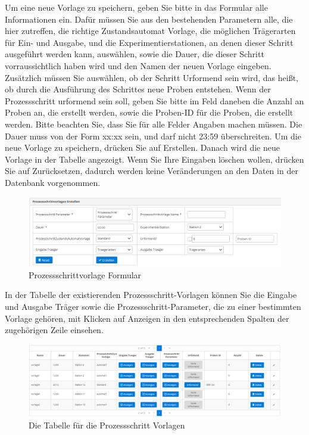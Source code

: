 \documentclass[enabledeprecatedfontcommands,fontsize=12pt,paper=a4,twoside]{scrartcl}
\begin{document}
Um eine neue Vorlage zu speichern, geben Sie bitte in das Formular alle Informationen ein. Dafür müssen Sie aus den bestehenden Parametern alle, die hier zutreffen, die richtige Zustandsautomat Vorlage, die möglichen Trägerarten für Ein- und Ausgabe, und die Experimentierstationen, an denen dieser Schritt ausgeführt werden kann, auswählen, sowie die Dauer, die dieser Schritt vorraussichtlich haben wird und den Namen der neuen Vorlage eingeben. Zusätzlich müssen Sie auswählen, ob der Schritt Urformend sein wird, das heißt, ob durch die Ausführung des Schrittes neue Proben entstehen. Wenn der Prozessschritt urformend sein soll, geben Sie bitte im Feld daneben die Anzahl an Proben an, die erstellt werden, sowie die Proben-ID für die Proben, die erstellt werden. Bitte beachten Sie, dass Sie für alle Felder Angaben machen müssen. Die Dauer muss von der Form xx:xx sein, und darf nicht 23:59 überschreiten. Um die neue Vorlage zu speichern, drücken Sie auf Erstellen. Danach wird die neue Vorlage in der Tabelle angezeigt. Wenn Sie Ihre Eingaben löschen wollen, drücken Sie auf Zurücksetzen, dadurch werden keine Veränderungen an den Daten in der Datenbank vorgenommen. \\

\begin{figure}[h!]
\begin{center}
 \includegraphics[scale=0.6]{screenshots/pk/prozessschrittvorlageformular.png}
  \caption{Prozessschrittvorlage Formular}
  \label{fig:boat1}
\end{center}
\end{figure}


In der Tabelle der existierenden Prozessschritt-Vorlagen können Sie die Eingabe und Ausgabe Träger sowie die Prozessschritt-Parameter, die zu einer bestimmten Vorlage gehören, mit Klicken auf Anzeigen in den entsprechenden Spalten der zugehörigen Zeile einsehen. \\

\begin{figure}[h!]
\begin{center}
 \includegraphics[width=\textwidth]{screenshots/pk/prozessschrittvorlagetabelle.png}
  \caption{Die Tabelle für die Prozessschritt Vorlagen}
  \label{fig:boat2}
\end{center}
\end{figure}
\end{document}
